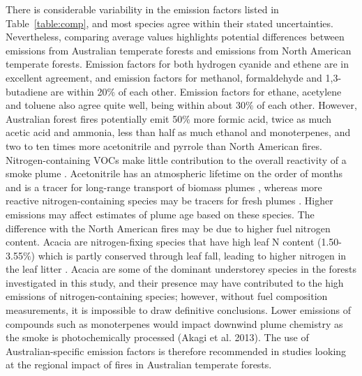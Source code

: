 \documentclass[acp, manuscript]{copernicus}
\begin{document}
There is considerable variability in the emission factors listed in Table~\ref{table:comp}, and most species agree within their stated uncertainties. Nevertheless, comparing average values highlights potential differences between emissions from Australian temperate forests and emissions from North American temperate forests. Emission  factors for both hydrogen cyanide and ethene are in excellent agreement, and emission factors for methanol, formaldehyde and 1,3-butadiene are within 20$\%$ of each other. Emission factors for ethane, acetylene and toluene also agree quite well, being within about 30$\%$ of each other. However, Australian forest fires potentially emit 50$\%$ more formic acid, twice as much acetic acid and ammonia, less than half as much ethanol and monoterpenes, and two to ten times more acetonitrile and pyrrole than North American fires. 
Nitrogen-containing VOCs make little contribution to the overall reactivity of a smoke plume \citep{Gilman2015}. Acetonitrile has an atmospheric lifetime on the order of months and is a tracer for long-range transport of biomass plumes \citep{Bange2000}, whereas more reactive nitrogen-containing species may be tracers for fresh plumes \citep{Gilman2015,Coggon2016}. Higher emissions may affect estimates of plume age based on these species. 
The difference with the North American fires may be due to higher fuel nitrogen content. Acacia are nitrogen-fixing species that have high leaf N content (1.50-3.55$\%$) which is partly conserved through leaf fall, leading to higher nitrogen in the leaf litter \citep{Snowdon2005}. Acacia are some of the dominant understorey species in the forests investigated in this study, and their presence may have contributed to the high emissions of nitrogen-containing species; however, without fuel composition measurements, it is impossible to draw definitive conclusions. 
Lower emissions of compounds such as monoterpenes would impact downwind plume chemistry as the smoke is photochemically processed (Akagi et al. 2013). 
The use of Australian-specific emission factors is therefore recommended in studies looking at the regional impact of fires in Australian temperate forests. 
\end{document}
